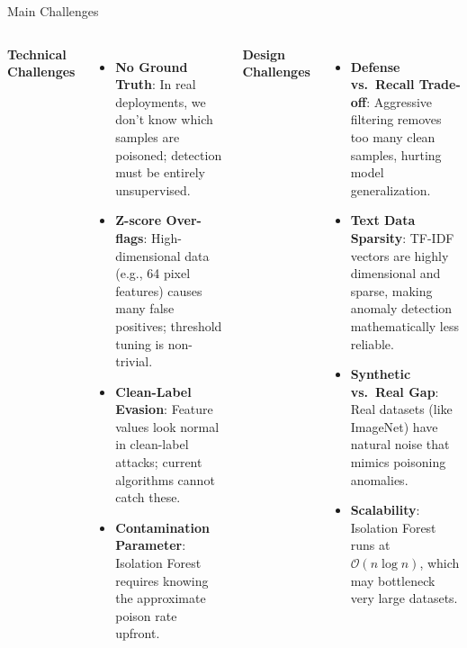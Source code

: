 \documentclass[aspectratio=169]{beamer}
\begin{document}
	\begin{frame}{Main Challenges}
		\small
		\begin{columns}[T]
			\textbf{Technical Challenges}
			\begin{itemize}\setlength{\itemsep}{0pt}
				\item \textbf{No Ground Truth}: In real deployments, we don't know which samples are poisoned; detection must be entirely unsupervised.
				\item \textbf{Z-score Over-flags}: High-dimensional data (e.g., 64 pixel features) causes many false positives; threshold tuning is non-trivial.
				\item \textbf{Clean-Label Evasion}: Feature values look normal in clean-label attacks; current algorithms cannot catch these.
				\item \textbf{Contamination Parameter}: Isolation Forest requires knowing the approximate poison rate upfront.
			\end{itemize}
			
			\textbf{Design Challenges}
			\begin{itemize}\setlength{\itemsep}{0pt}
				\item \textbf{Defense vs.\ Recall Trade-off}: Aggressive filtering removes too many clean samples, hurting model generalization.
				\item \textbf{Text Data Sparsity}: TF-IDF vectors are highly dimensional and sparse, making anomaly detection mathematically less reliable.
				\item \textbf{Synthetic vs.\ Real Gap}: Real datasets (like ImageNet) have natural noise that mimics poisoning anomalies.
				\item \textbf{Scalability}: Isolation Forest runs at $\mathcal{O}(n \log n)$, which may bottleneck very large datasets.
			\end{itemize}
		\end{columns}
	\end{frame}
	
\end{document}
